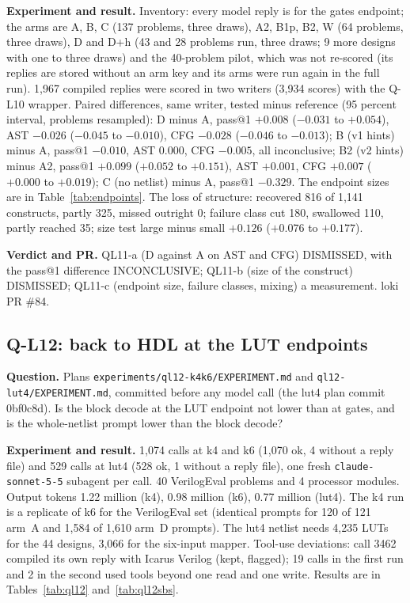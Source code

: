 \documentclass[conference]{IEEEtran}
\newcommand{\hev}[1]{\par\smallskip\noindent\textbf{#1}}
\newcommand{\code}[1]{\texttt{#1}}
\begin{document}
\hev{Experiment and result.} Inventory: every model reply is for the gates endpoint; the arms are A, B, C (137 problems, three draws), A2, B1p, B2, W (64 problems, three draws), D and D+h (43 and 28 problems run, three draws; 9 more designs with one to three draws) and the 40-problem pilot, which was not re-scored (its replies are stored without an arm key and its arms were run again in the full run). 1,967 compiled replies were scored in two writers (3,934 scores) with the Q-L10 wrapper. Paired differences, same writer, tested minus reference (95 percent interval, problems resampled): D minus A, pass@1 $+0.008$ ($-0.031$ to $+0.054$), AST $-0.026$ ($-0.045$ to $-0.010$), CFG $-0.028$ ($-0.046$ to $-0.013$); B (v1 hints) minus A, pass@1 $-0.010$, AST $0.000$, CFG $-0.005$, all inconclusive; B2 (v2 hints) minus A2, pass@1 $+0.099$ ($+0.052$ to $+0.151$), AST $+0.001$, CFG $+0.007$ ($+0.000$ to $+0.019$); C (no netlist) minus A, pass@1 $-0.329$. The endpoint sizes are in Table~\ref{tab:endpoints}. The loss of structure: recovered 816 of 1,141 constructs, partly 325, missed outright 0; failure class cut 180, swallowed 110, partly reached 35; size test large minus small $+0.126$ ($+0.076$ to $+0.177$).

\hev{Verdict and PR.} QL11-a (D against A on AST and CFG) DISMISSED, with the pass@1 difference INCONCLUSIVE; QL11-b (size of the construct) DISMISSED; QL11-c (endpoint size, failure classes, mixing) a measurement. loki PR \#84.

\subsection{Q-L12: back to HDL at the LUT endpoints}
\label{rec:ql12}

\hev{Question.} Plans \code{experiments/}\allowbreak\code{ql12-k4k6/EXPERIMENT.md} and \code{ql12-lut4/EXPERIMENT.md}, committed before any model call (the lut4 plan commit 0bf0c8d). Is the block decode at the LUT endpoint not lower than at gates, and is the whole-netlist prompt lower than the block decode?

\hev{Experiment and result.} 1,074 calls at k4 and k6 (1,070 ok, 4 without a reply file) and 529 calls at lut4 (528 ok, 1 without a reply file), one fresh \code{claude-sonnet-5-5} subagent per call. 40 VerilogEval problems and 4 processor modules. Output tokens 1.22 million (k4), 0.98 million (k6), 0.77 million (lut4). The k4 run is a replicate of k6 for the VerilogEval set (identical prompts for 120 of 121 arm~A and 1,584 of 1,610 arm~D prompts). The lut4 netlist needs 4,235 LUTs for the 44 designs, 3,066 for the six-input mapper. Tool-use deviations: call 3462 compiled its own reply with Icarus Verilog (kept, flagged); 19 calls in the first run and 2 in the second used tools beyond one read and one write. Results are in Tables~\ref{tab:ql12} and~\ref{tab:ql12sbs}.
\end{document}

